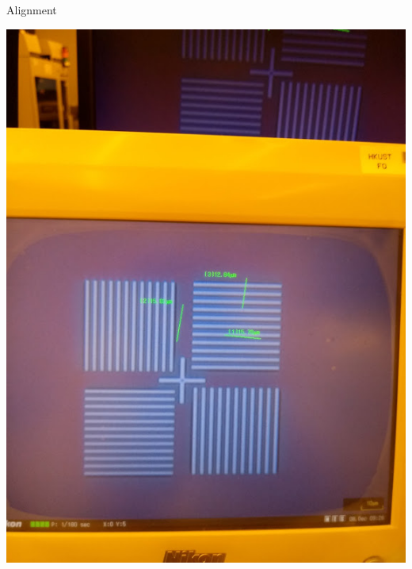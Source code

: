 \documentclass[aspectratio=169]{beamer}
\begin{document}
\begin{frame}{Alignment}
\begin{center}
\includegraphics[height=0.8\textheight]{images/20181211_125918.jpg}

\end{center}
\end{frame}
\end{document}
